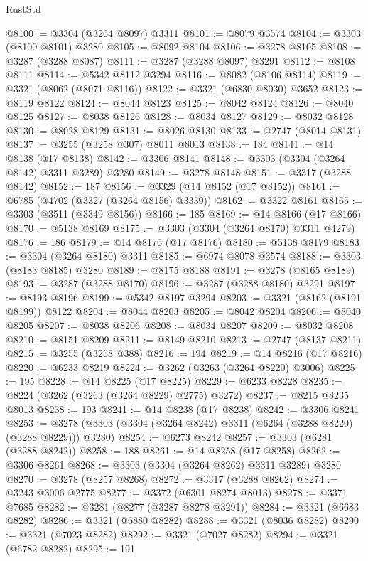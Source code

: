 \begin{lexlean}{RustStd}
\begin{coremodule}
@8100 := @3304 (@3264 @8097) @3311
@8101 := @8079 @3574
@8104 := @3303 (@8100 @8101) @3280
@8105 := @8092 @8104
@8106 := @3278 @8105
@8108 := @3287 (@3288 @8087)
@8111 := @3287 (@3288 @8097) @3291
@8112 := @8108 @8111
@8114 := @5342 @8112 @3294
@8116 := @8082 (@8106 @8114)
@8119 := @3321 (@8062 (@8071 @8116))
@8122 := @3321 (@6830 @8030) @3652
@8123 := @8119 @8122
@8124 := @8044 @8123
@8125 := @8042 @8124
@8126 := @8040 @8125
@8127 := @8038 @8126
@8128 := @8034 @8127
@8129 := @8032 @8128
@8130 := @8028 @8129
@8131 := @8026 @8130
@8133 := @2747 (@8014 @8131)
@8137 := @3255 (@3258 @307) @8011 @8013
@8138 := 184
@8141 := @14 @8138 (@17 @8138)
@8142 := @3306 @8141
@8148 := @3303 (@3304 (@3264 @8142) @3311 @3289) @3280
@8149 := @3278 @8148
@8151 := @3317 (@3288 @8142)
@8152 := 187
@8156 := @3329 (@14 @8152 (@17 @8152))
@8161 := @6785 (@4702 (@3327 (@3264 @8156) @3339))
@8162 := @3322 @8161
@8165 := @3303 (@3511 (@3349 @8156))
@8166 := 185
@8169 := @14 @8166 (@17 @8166)
@8170 := @5138 @8169
@8175 := @3303 (@3304 (@3264 @8170) @3311 @4279)
@8176 := 186
@8179 := @14 @8176 (@17 @8176)
@8180 := @5138 @8179
@8183 := @3304 (@3264 @8180) @3311
@8185 := @6974 @8078 @3574
@8188 := @3303 (@8183 @8185) @3280
@8189 := @8175 @8188
@8191 := @3278 (@8165 @8189)
@8193 := @3287 (@3288 @8170)
@8196 := @3287 (@3288 @8180) @3291
@8197 := @8193 @8196
@8199 := @5342 @8197 @3294
@8203 := @3321 (@8162 (@8191 @8199)) @8122
@8204 := @8044 @8203
@8205 := @8042 @8204
@8206 := @8040 @8205
@8207 := @8038 @8206
@8208 := @8034 @8207
@8209 := @8032 @8208
@8210 := @8151 @8209
@8211 := @8149 @8210
@8213 := @2747 (@8137 @8211)
@8215 := @3255 (@3258 @388)
@8216 := 194
@8219 := @14 @8216 (@17 @8216)
@8220 := @6233 @8219
@8224 := @3262 (@3263 (@3264 @8220) @3006)
@8225 := 195
@8228 := @14 @8225 (@17 @8225)
@8229 := @6233 @8228
@8235 := @8224 (@3262 (@3263 (@3264 @8229) @2775) @3272)
@8237 := @8215 @8235 @8013
@8238 := 193
@8241 := @14 @8238 (@17 @8238)
@8242 := @3306 @8241
@8253 := @3278 (@3303 (@3304 (@3264 @8242) @3311 (@6264 (@3288 @8220) (@3288 @8229))) @3280)
@8254 := @6273 @8242
@8257 := @3303 (@6281 (@3288 @8242))
@8258 := 188
@8261 := @14 @8258 (@17 @8258)
@8262 := @3306 @8261
@8268 := @3303 (@3304 (@3264 @8262) @3311 @3289) @3280
@8270 := @3278 (@8257 @8268)
@8272 := @3317 (@3288 @8262)
@8274 := @3243 @3006 @2775
@8277 := @3372 (@6301 @8274 @8013)
@8278 := @3371 @7685
@8282 := @3281 (@8277 (@3287 @8278 @3291))
@8284 := @3321 (@6683 @8282)
@8286 := @3321 (@6880 @8282)
@8288 := @3321 (@8036 @8282)
@8290 := @3321 (@7023 @8282)
@8292 := @3321 (@7027 @8282)
@8294 := @3321 (@6782 @8282)
@8295 := 191

\end{coremodule}
\end{lexlean}

